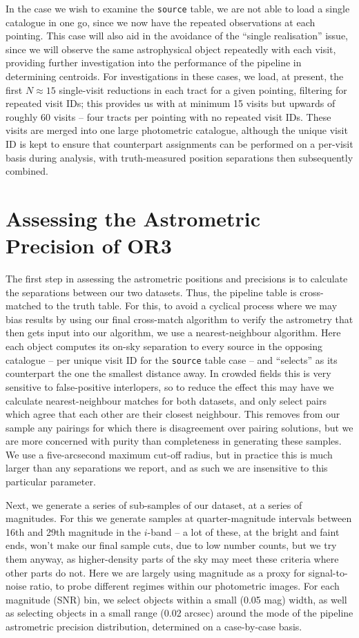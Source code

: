 \documentclass[SE,lsstdraft,authoryear,toc]{lsstdoc}
\begin{document}
In the case we wish to examine the \texttt{source} table, we are not able to load a single catalogue in one go, since we now have the repeated observations at each pointing.
This case will also aid in the avoidance of the ``single realisation'' issue, since we will observe the same astrophysical object repeatedly with each visit, providing further investigation into the performance of the pipeline in determining centroids.
For investigations in these cases, we load, at present, the first $N \approx 15$ single-visit reductions in each tract for a given pointing, filtering for repeated visit IDs; this provides us with at minimum 15 visits but upwards of roughly 60 visits -- four tracts per pointing with no repeated visit IDs.
These visits are merged into one large photometric catalogue, although the unique visit ID is kept to ensure that counterpart assignments can be performed on a per-visit basis during analysis, with truth-measured position separations then subsequently combined.

\section{Assessing the Astrometric Precision of OR3}
The first step in assessing the astrometric positions and precisions is to calculate the separations between our two datasets.
Thus, the pipeline table is cross-matched to the truth table.
For this, to avoid a cyclical process where we may bias results by using our final cross-match algorithm to verify the astrometry that then gets input into our algorithm, we use a nearest-neighbour algorithm.
Here each object computes its on-sky separation to every source in the opposing catalogue -- per unique visit ID for the \texttt{source} table case -- and ``selects'' as its counterpart the one the smallest distance away.
In crowded fields this is very sensitive to false-positive interlopers, so to reduce the effect this may have we calculate nearest-neighbour matches for both datasets, and only select pairs which agree that each other are their closest neighbour.
This removes from our sample any pairings for which there is disagreement over pairing solutions, but we are more concerned with purity than completeness in generating these samples.
We use a five-arcsecond maximum cut-off radius, but in practice this is much larger than any separations we report, and as such we are insensitive to this particular parameter.

Next, we generate a series of sub-samples of our dataset, at a series of magnitudes.
For this we generate samples at quarter-magnitude intervals between 16th and 29th magnitude in the $i$-band -- a lot of these, at the bright and faint ends, won't make our final sample cuts, due to low number counts, but we try them anyway, as higher-density parts of the sky may meet these criteria where other parts do not.
Here we are largely using magnitude as a proxy for signal-to-noise ratio, to probe different regimes within our photometric images.
For each magnitude (SNR) bin, we select objects within a small (0.05 mag) width, as well as selecting objects in a small range (0.02 arcsec) around the mode of the pipeline astrometric precision distribution, determined on a case-by-case basis.
\end{document}
